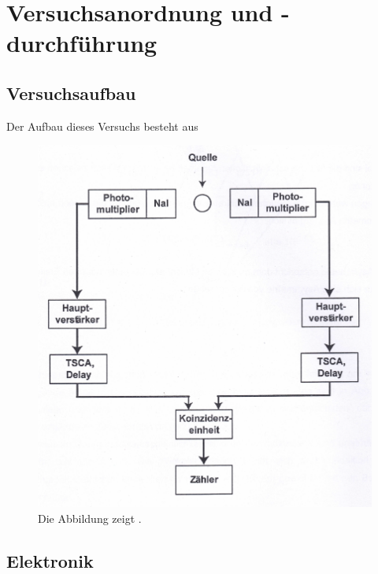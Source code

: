 \section{Versuchsanordnung und -durchführung}

\subsection{Versuchsaufbau}

Der Aufbau dieses Versuchs besteht aus 
\begin{figure}[H]
	\centering
	\includegraphics[width=1.0\textwidth]{img/schaltung}
	\caption{Die Abbildung zeigt .}
	\label{schaltung}
\end{figure}
\noindent 

\subsection{Elektronik}


